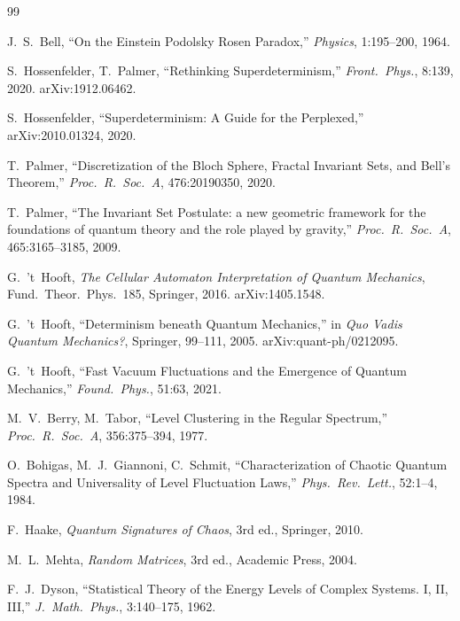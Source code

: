 \documentclass[12pt,a4paper]{article}
\theoremstyle{definition}
\theoremstyle{remark}
\begin{document}
\begin{thebibliography}{99}

 J.~S.~Bell, ``On the Einstein Podolsky Rosen Paradox,''
  \emph{Physics}, 1:195--200, 1964.


 S.~Hossenfelder, T.~Palmer, ``Rethinking
  Superdeterminism,'' \emph{Front.\ Phys.}, 8:139, 2020.
  arXiv:1912.06462.

 S.~Hossenfelder, ``Superdeterminism: A Guide
  for the Perplexed,'' arXiv:2010.01324, 2020.

 T.~Palmer, ``Discretization of the Bloch Sphere, Fractal
  Invariant Sets, and Bell's Theorem,'' \emph{Proc.\ R.\ Soc.\ A},
  476:20190350, 2020.

 T.~Palmer, ``The Invariant Set Postulate: a new geometric
  framework for the foundations of quantum theory and the role played by
  gravity,'' \emph{Proc.\ R.\ Soc.\ A}, 465:3165--3185, 2009.


 G.~'t~Hooft, \emph{The Cellular Automaton Interpretation
  of Quantum Mechanics}, Fund.\ Theor.\ Phys.\ 185, Springer, 2016.
  arXiv:1405.1548.

 G.~'t~Hooft, ``Determinism beneath Quantum Mechanics,'' in
  \emph{Quo Vadis Quantum Mechanics?}, Springer, 99--111, 2005.
  arXiv:quant-ph/0212095.

 G.~'t~Hooft, ``Fast Vacuum Fluctuations and the Emergence
  of Quantum Mechanics,'' \emph{Found.\ Phys.}, 51:63, 2021.


 M.~V.~Berry, M.~Tabor, ``Level Clustering in the
  Regular Spectrum,'' \emph{Proc.\ R.\ Soc.\ A}, 356:375--394, 1977.

 O.~Bohigas, M.~J.~Giannoni, C.~Schmit, ``Characterization
  of Chaotic Quantum Spectra and Universality of Level Fluctuation Laws,''
  \emph{Phys.\ Rev.\ Lett.}, 52:1--4, 1984.

 F.~Haake, \emph{Quantum Signatures of Chaos}, 3rd ed.,
  Springer, 2010.

 M.~L.~Mehta, \emph{Random Matrices}, 3rd ed., Academic
  Press, 2004.

 F.~J.~Dyson, ``Statistical Theory of the Energy Levels of
  Complex Systems. I, II, III,'' \emph{J.\ Math.\ Phys.}, 3:140--175, 1962.


\end{thebibliography}
\end{document}
